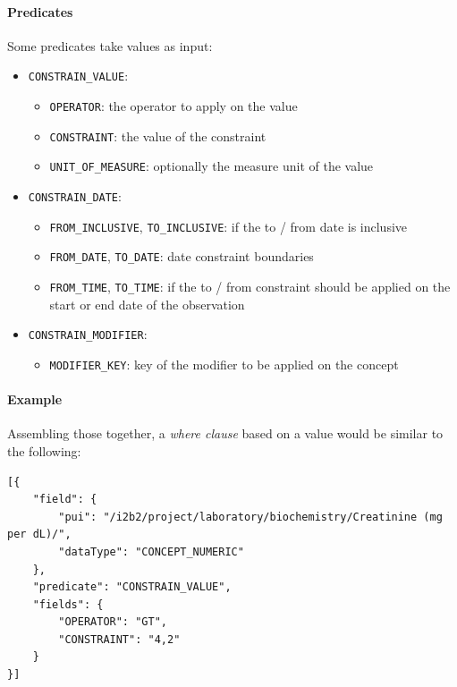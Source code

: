 \paragraph{Predicates}
Some predicates take values as input:
\begin{itemize}
    \setlength\itemsep{0em}

    \item \verb|CONSTRAIN_VALUE|:
    \begin{itemize}
        \item \verb|OPERATOR|: the operator to apply on the value 
        \item \verb|CONSTRAINT|: the value of the constraint
        \item \verb|UNIT_OF_MEASURE|: optionally the measure unit of the value
    \end{itemize}
    
    \item \verb|CONSTRAIN_DATE|:
    \begin{itemize}
        \item \verb|FROM_INCLUSIVE|, \verb|TO_INCLUSIVE|: if the to / from date is inclusive
        \item \verb|FROM_DATE|, \verb|TO_DATE|: date constraint boundaries
        \item \verb|FROM_TIME|, \verb|TO_TIME|: if the to / from constraint should be applied on the start or end date of the observation
    \end{itemize}
    
    \item \verb|CONSTRAIN_MODIFIER|:
    \begin{itemize}
        \item \verb|MODIFIER_KEY|: key of the modifier to be applied on the concept
    \end{itemize}
\end{itemize}

\paragraph{Example}
Assembling those together, a \emph{where clause} based on a value would be similar to the following:
\begin{samepage}
\begin{verbatim}
[{
    "field": {
        "pui": "/i2b2/project/laboratory/biochemistry/Creatinine (mg per dL)/",
        "dataType": "CONCEPT_NUMERIC"
    },
    "predicate": "CONSTRAIN_VALUE",
    "fields": {
        "OPERATOR": "GT",
        "CONSTRAINT": "4,2"
    }
}]
\end{verbatim}
\end{samepage}


